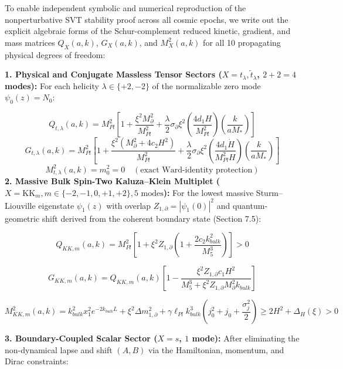 \documentclass[aps,prd,onecolumn,superscriptaddress,nofootinbib,longbibliography,10pt]{revtex4-2}
\begin{document}
{{  To enable independent symbolic and numerical reproduction of the nonperturbative SVT stability proof across all cosmic epochs, we write out the explicit algebraic forms of the Schur-complement reduced kinetic, gradient, and mass matrices \(Q_X(a,k)\), \(G_X(a,k)\), and \(M_X^2(a,k)\) for all 10 propagating physical degrees of freedom:


  \textbf{1. Physical and Conjugate Massless Tensor Sectors (\(X = t_\lambda, \tilde{t}_\lambda\), \(2 + 2 = 4\) modes):} For each helicity \(\lambda \in \{+2, -2\}\) of the normalizable zero mode \(\psi_0(z) = N_0\):


  \[ Q_{t,\lambda}(a,k) = M_{Pl}^2 \left[ 1 + \frac{\xi^2 M_\partial^2}{M_{Pl}^2} + \frac{\lambda}{2}\sigma_\partial \xi^2 \left(\frac{4d_1 H}{M_{Pl}^2}\right)\left(\frac{k}{aM_*}\right) \right] \]
  \[ G_{t,\lambda}(a,k) = M_{Pl}^2 \left[ 1 + \frac{\xi^2(M_\partial^2 + 4c_2 H^2)}{M_{Pl}^2} + \frac{\lambda}{2}\sigma_\partial \xi^2 \left(\frac{4d_1\dot{H}}{M_{Pl}^2 H}\right)\left(\frac{k}{aM_*}\right) \right] \]
  \[ M_{t,\lambda}^2(a,k) = m_0^2 = 0 \quad (\text{exact Ward-identity protection}) \]
  \textbf{2. Massive Bulk Spin-Two Kaluza–Klein Multiplet (\(X = \mathrm{KK}_m, m \in \{-2, -1, 0, +1, +2\}, 5\text{ modes}\)):} For the lowest massive Sturm–Liouville eigenstate \(\psi_1(z)\) with overlap \(Z_{1,\partial} = |\psi_1(0)|^2\) and quantum-geometric shift derived from the coherent boundary state (Section 7.5):

\[ Q_{KK,m}(a,k) = M_{Pl}^2 \left[1+\xi^2 Z_{1,\partial}\left(1+\frac{2c_2 k_{bulk}^2}{M_5^3}\right)\right] > 0 \]


\[ G_{KK,m}(a,k) = Q_{KK,m}(a,k)\left[ 1 - \frac{\xi^2 Z_{1,\partial} c_1 H^2}{M_5^3 + \xi^2 Z_{1,\partial} M_{\partial}^2 k_{bulk}} \right] \]


\[ M_{KK,m}^2(a,k) = k_{bulk}^2 x_1^2 e^{-2k_{bulk}L} + \xi^2\Delta m_{1,\partial}^2 + \gamma\ell_{Pl}k_{bulk}^3\left( j_0^2 + j_0 + \frac{\sigma_j^2}{2} \right) \ge 2H^2 + \Delta_H(\xi) > 0 \]

\textbf{3. Boundary-Coupled Scalar Sector (\(X = s\), \(1\) mode):} After eliminating the non-dynamical lapse and shift \((A, B)\) via the Hamiltonian, momentum, and Dirac constraints:


}}
\end{document}

